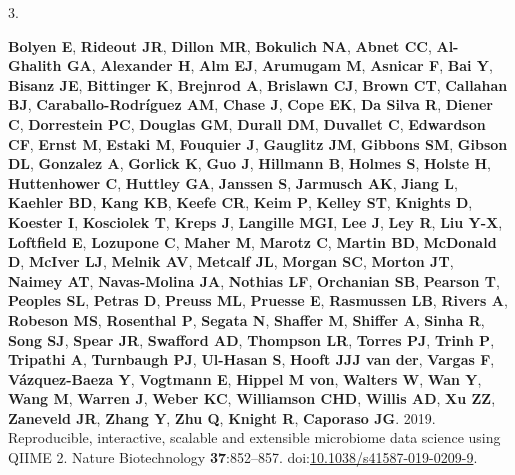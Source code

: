 \documentclass[
  11pt,
]{article}
\newlength{\cslhangindent}
\newlength{\csllabelwidth}
\newenvironment{CSLReferences}[2] %
 {\begin{list}{}{%
  \setlength{\itemindent}{0pt}
  \setlength{\leftmargin}{0pt}
  \setlength{\parsep}{0pt}
  \ifodd #1
   \setlength{\leftmargin}{\cslhangindent}
   \setlength{\itemindent}{-1\cslhangindent}
  \fi
  \setlength{\itemsep}{#2\baselineskip}}}
 {\end{list}}
\newcommand{\CSLLeftMargin}[1]{\parbox[t]{\csllabelwidth}{\strut#1\strut}}
\newcommand{\CSLRightInline}[1]{\parbox[t]{\linewidth - \csllabelwidth}{\strut#1\strut}}
\begin{document}
\begin{CSLReferences}{0}{1}
\CSLLeftMargin{3. }%
\CSLRightInline{\textbf{Bolyen E}, \textbf{Rideout JR}, \textbf{Dillon
MR}, \textbf{Bokulich NA}, \textbf{Abnet CC}, \textbf{Al-Ghalith GA},
\textbf{Alexander H}, \textbf{Alm EJ}, \textbf{Arumugam M},
\textbf{Asnicar F}, \textbf{Bai Y}, \textbf{Bisanz JE},
\textbf{Bittinger K}, \textbf{Brejnrod A}, \textbf{Brislawn CJ},
\textbf{Brown CT}, \textbf{Callahan BJ}, \textbf{Caraballo-Rodríguez
AM}, \textbf{Chase J}, \textbf{Cope EK}, \textbf{Da Silva R},
\textbf{Diener C}, \textbf{Dorrestein PC}, \textbf{Douglas GM},
\textbf{Durall DM}, \textbf{Duvallet C}, \textbf{Edwardson CF},
\textbf{Ernst M}, \textbf{Estaki M}, \textbf{Fouquier J},
\textbf{Gauglitz JM}, \textbf{Gibbons SM}, \textbf{Gibson DL},
\textbf{Gonzalez A}, \textbf{Gorlick K}, \textbf{Guo J},
\textbf{Hillmann B}, \textbf{Holmes S}, \textbf{Holste H},
\textbf{Huttenhower C}, \textbf{Huttley GA}, \textbf{Janssen S},
\textbf{Jarmusch AK}, \textbf{Jiang L}, \textbf{Kaehler BD},
\textbf{Kang KB}, \textbf{Keefe CR}, \textbf{Keim P}, \textbf{Kelley
ST}, \textbf{Knights D}, \textbf{Koester I}, \textbf{Kosciolek T},
\textbf{Kreps J}, \textbf{Langille MGI}, \textbf{Lee J}, \textbf{Ley R},
\textbf{Liu Y-X}, \textbf{Loftfield E}, \textbf{Lozupone C},
\textbf{Maher M}, \textbf{Marotz C}, \textbf{Martin BD},
\textbf{McDonald D}, \textbf{McIver LJ}, \textbf{Melnik AV},
\textbf{Metcalf JL}, \textbf{Morgan SC}, \textbf{Morton JT},
\textbf{Naimey AT}, \textbf{Navas-Molina JA}, \textbf{Nothias LF},
\textbf{Orchanian SB}, \textbf{Pearson T}, \textbf{Peoples SL},
\textbf{Petras D}, \textbf{Preuss ML}, \textbf{Pruesse E},
\textbf{Rasmussen LB}, \textbf{Rivers A}, \textbf{Robeson MS},
\textbf{Rosenthal P}, \textbf{Segata N}, \textbf{Shaffer M},
\textbf{Shiffer A}, \textbf{Sinha R}, \textbf{Song SJ}, \textbf{Spear
JR}, \textbf{Swafford AD}, \textbf{Thompson LR}, \textbf{Torres PJ},
\textbf{Trinh P}, \textbf{Tripathi A}, \textbf{Turnbaugh PJ},
\textbf{Ul-Hasan S}, \textbf{Hooft JJJ van der}, \textbf{Vargas F},
\textbf{Vázquez-Baeza Y}, \textbf{Vogtmann E}, \textbf{Hippel M von},
\textbf{Walters W}, \textbf{Wan Y}, \textbf{Wang M}, \textbf{Warren J},
\textbf{Weber KC}, \textbf{Williamson CHD}, \textbf{Willis AD},
\textbf{Xu ZZ}, \textbf{Zaneveld JR}, \textbf{Zhang Y}, \textbf{Zhu Q},
\textbf{Knight R}, \textbf{Caporaso JG}. 2019. Reproducible,
interactive, scalable and extensible microbiome data science using QIIME
2. Nature Biotechnology \textbf{37}:852--857.
doi:\href{https://doi.org/10.1038/s41587-019-0209-9}{10.1038/s41587-019-0209-9}.}


\end{CSLReferences}
\end{document}
